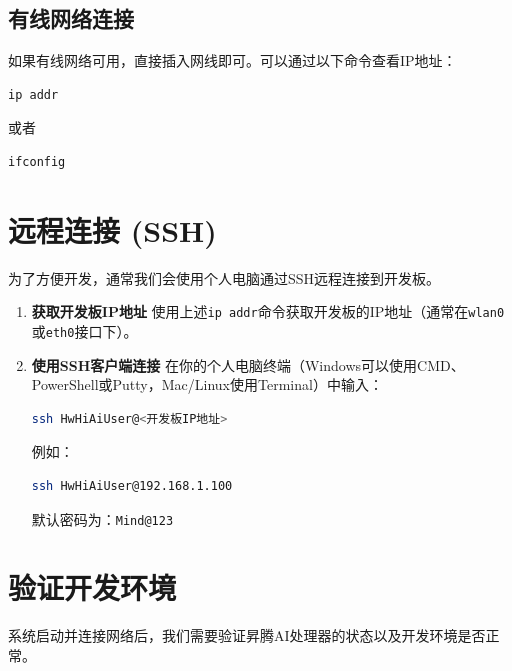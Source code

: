 \subsection{有线网络连接}\label{src-experiment-case0-h20}

如果有线网络可用，直接插入网线即可。可以通过以下命令查看IP地址：

\begin{lstlisting}[language=bash]
ip addr
\end{lstlisting}

或者

\begin{lstlisting}[language=bash]
ifconfig
\end{lstlisting}

\section{远程连接 (SSH)}\label{src-experiment-case0-h21}

为了方便开发，通常我们会使用个人电脑通过SSH远程连接到开发板。

\begin{enumerate}
\def\labelenumi{\arabic{enumi}.}
\item
  \textbf{获取开发板IP地址}
  使用上述\passthrough{\lstinline!ip addr!}命令获取开发板的IP地址（通常在\passthrough{\lstinline!wlan0!}或\passthrough{\lstinline!eth0!}接口下）。
\item
  \textbf{使用SSH客户端连接}
  在你的个人电脑终端（Windows可以使用CMD、PowerShell或Putty，Mac/Linux使用Terminal）中输入：

\begin{lstlisting}[language=bash]
ssh HwHiAiUser@<开发板IP地址>
\end{lstlisting}

  例如：

\begin{lstlisting}[language=bash]
ssh HwHiAiUser@192.168.1.100
\end{lstlisting}

  默认密码为：\passthrough{\lstinline!Mind@123!}
\end{enumerate}

\section{验证开发环境}\label{src-experiment-case0-h22}

系统启动并连接网络后，我们需要验证昇腾AI处理器的状态以及开发环境是否正常。


